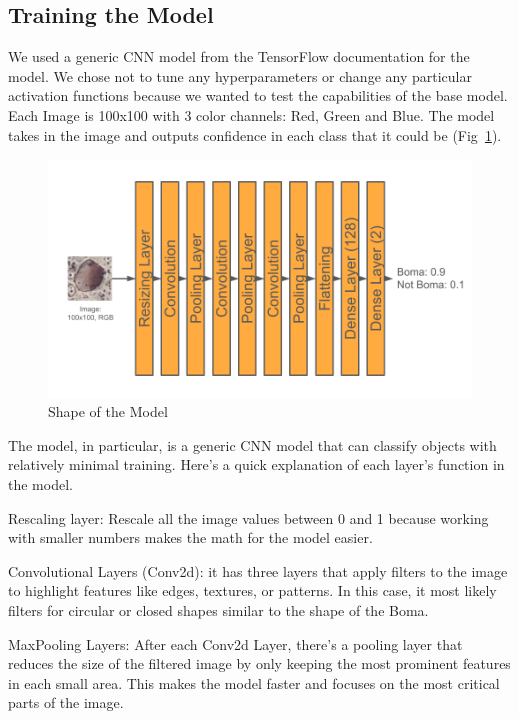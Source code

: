 \documentclass[10pt]{article}
\begin{document}
\subsection{Training the Model}
\label{training}

We used a generic CNN model from the TensorFlow documentation for the model. We chose not to tune any hyperparameters or change any particular activation functions because we wanted to test the capabilities of the base model. Each Image is 100x100 with 3 color channels: Red, Green and Blue. The model takes in the image and outputs confidence in each class that it could be (Fig~\ref{fig:model_shape}).

\begin{figure} [H] %
    \centering
    \includegraphics[width=1\linewidth]{images/Model Shape.png}
    \caption{Shape of the Model}
    \label{fig:model_shape}
\end{figure}

The model, in particular, is a generic CNN model that can classify objects with relatively minimal training. Here's a quick explanation of each layer's function in the model.

Rescaling layer: Rescale all the image values between 0 and 1 because working with smaller numbers makes the math for the model easier.

Convolutional Layers (Conv2d): it has three layers that apply filters to the image to highlight features like edges, textures, or patterns. In this case, it most likely filters for circular or closed shapes similar to the shape of the Boma.

MaxPooling Layers: After each Conv2d Layer, there's a pooling layer that reduces the size of the filtered image by only keeping the most prominent features in each small area. This makes the model faster and focuses on the most critical parts of the image.
\end{document}
